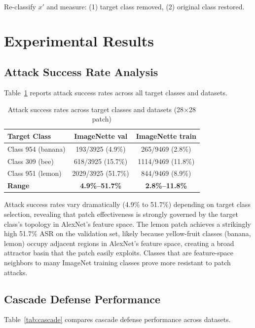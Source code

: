 \documentclass[conference]{IEEEtran}
\begin{document}
Re-classify $x'$ and measure: (1) target class removed, (2) original class restored.

\section{Experimental Results}

\subsection{Attack Success Rate Analysis}

Table~\ref{tab:attack_success} reports attack success rates across all target classes and datasets.

\begin{table}[h]
\centering
\caption{Attack success rates across target classes and datasets (28$\times$28 patch)}
\label{tab:attack_success}
\begin{tabular}{lcc}
\toprule
\textbf{Target Class} & \textbf{ImageNette val} & \textbf{ImageNette train} \\
\midrule
Class 954 (banana) & 193/3925 (4.9\%)  & 265/9469 (2.8\%) \\
Class 309 (bee)    & 618/3925 (15.7\%) & 1114/9469 (11.8\%) \\
Class 951 (lemon)  & 2029/3925 (51.7\%) & 844/9469 (8.9\%) \\
\midrule
\textbf{Range}     & \textbf{4.9\%--51.7\%} & \textbf{2.8\%--11.8\%} \\
\bottomrule
\end{tabular}
\end{table}

Attack success rates vary dramatically (4.9\% to 51.7\%) depending on target class selection, revealing that patch effectiveness is strongly governed by the target class's topology in AlexNet's feature space. The lemon patch achieves a strikingly high 51.7\% ASR on the validation set, likely because yellow-fruit classes (banana, lemon) occupy adjacent regions in AlexNet's feature space, creating a broad attractor basin that the patch easily exploits. Classes that are feature-space neighbors to many ImageNet training classes prove more resistant to patch attacks.

\subsection{Cascade Defense Performance}

Table~\ref{tab:cascade} compares cascade defense performance across datasets.
\end{document}
